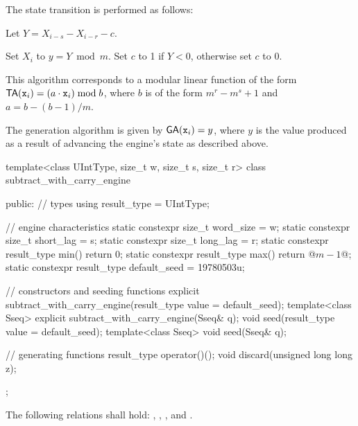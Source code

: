 \pnum
The state transition%
%
is performed as follows:
\begin{enumeratea}
 \item
   Let $Y = X_{i-s} - X_{i-r} - c$.
 \item
   Set $X_i$ to $y = Y \bmod m$.
   Set $c$ to 1 if $Y < 0$,
   otherwise set $c$ to 0.
\end{enumeratea}
\begin{note}
 This algorithm corresponds
 to a modular linear function
 of the form
 $\mathsf{TA}(\texttt{x}_{i}) = (a \cdot \texttt{x}_{i}) \bmod b$,
 where $b$ is of the form
 $m^r - m^s + 1$
 and $a = b - (b - 1) / m$.
\end{note}

\pnum
The generation algorithm%
%
is given by $\mathsf{GA}(\texttt{x}_{i}) = y$,
where $y$ is the value produced as a result
of advancing the engine's state as described above.

%
\begin{codeblock}
template<class UIntType, size_t w, size_t s, size_t r>
  class subtract_with_carry_engine {
  public:
    // types
    using result_type = UIntType;

    // engine characteristics
    static constexpr size_t word_size = w;
    static constexpr size_t short_lag = s;
    static constexpr size_t long_lag = r;
    static constexpr result_type min() { return 0; }
    static constexpr result_type max() { return @$m - 1$@; }
    static constexpr result_type default_seed = 19780503u;

    // constructors and seeding functions
    explicit subtract_with_carry_engine(result_type value = default_seed);
    template<class Sseq> explicit subtract_with_carry_engine(Sseq& q);
    void seed(result_type value = default_seed);
    template<class Sseq> void seed(Sseq& q);

    // generating functions
    result_type operator()();
    void discard(unsigned long long z);
  };
\end{codeblock}

\pnum
The following relations shall hold:
  ,
  ,
  ,
and
  .

